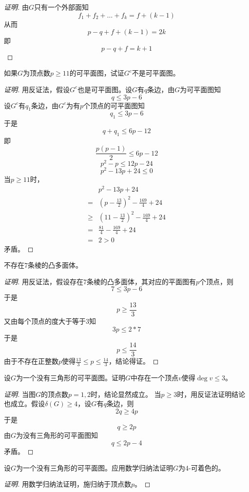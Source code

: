 \documentclass{article}
\begin{document}
\begin{CJK}{UTF8}{gbsn}
\begin{proof}[证明]
  由$G$只有一个外部面知
  \[f_1 + f_2 + \ldots + f_k = f + (k-1)\]
  从而
  \[p-q+f+(k-1)=2k\]
  即
  \[p-q+f = k + 1\]
  \end{proof}  
\begin{Exercise}
    如果$G$为顶点数$p\geq 11$的可平面图，试证$G^c$不是可平面图。
\end{Exercise}
\begin{proof}[证明]
    用反证法，假设$G^c$也是可平面图。设$G$有$q$条边，由$G$为可平面图知
  \[q \leq 3p - 6\]
  设$G^c$有$q_1$条边，由$G^c$为有$p$个顶点的可平面图知
  \[q_1 \leq 3p - 6\]
  于是
  \[q + q _1 \leq 6p-12\]
  即
  \[\frac{p(p-1)}{2} \leq 6p-12\]
  \[p^2-p \leq 12p-24\]
  \[p^2-13p+24 \leq 0\]
  当$p\geq 11$时，
  \begin{equation*}
    \begin{split}
     &p^2-13p+24\\
     =&(p-\frac{13}{2})^2-\frac{169}{4}+24\\
     \geq&(11-\frac{13}{2})^2-\frac{169}{4} + 24\\
     =&\frac{81}{4} - \frac{169}{4} + 24\\
     =&2 > 0
    \end{split}
  \end{equation*}
  矛盾。
\end{proof}
\begin{Exercise}
    不存在$7$条棱的凸多面体。
\end{Exercise}
\begin{proof}[证明]
    用反证法，假设存在$7$条棱的凸多面体，其对应的平面图有$p$个顶点，则
    \[7 \leq 3p - 6\]
    于是
    \[p \geq \frac{13}{3}\]
    又由每个顶点的度大于等于$3$知
    \[3p \leq 2 * 7\]
    于是
    \[p \leq \frac{14}{3}\]
    由于不存在正整数$p$使得$\frac{13}{3} \leq p \leq \frac{14}{3}$，结论得证。
  \end{proof}
\begin{Exercise}
    设$G$为一个没有三角形的可平面图。证明$G$中存在一个顶点$v$使得$\deg v \leq 3$。
\end{Exercise}
\begin{proof}[证明]
    当图$G$的顶点数$p=1,2$时，结论显然成立。
    当$p \geq 3$时，用反证法证明结论也成立。假设$\delta (G) \geq 4$，设$G$有$q$条边，则
    \[2q \geq 4p\]
    于是\[q \geq 2p\]
    由$G$为没有三角形的可平面图知
    \[q \leq 2p - 4\]
  矛盾。  
  \end{proof}
\begin{Exercise}
    设$G$为一个没有三角形的可平面图。应用数学归纳法证明$G$为4-可着色的。
\end{Exercise}
\begin{proof}[证明]用数学归纳法证明，施归纳于顶点数$p$。


\end{proof}
\end{CJK}
\end{document}
